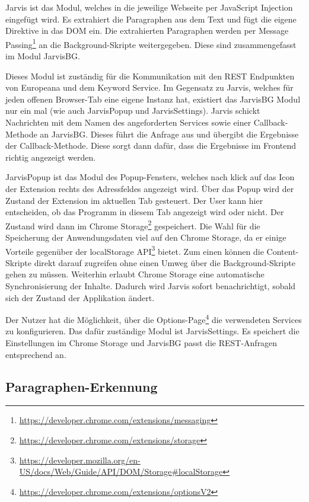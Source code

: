  Jarvis ist das Modul, welches in die jeweilige Webseite per JavaScript Injection eingefügt wird. Es extrahiert die Paragraphen aus dem Text und fügt die eigene Direktive in das DOM ein. Die extrahierten Paragraphen werden per Message Passing\footnote{\url{https://developer.chrome.com/extensions/messaging}} an die Background-Skripte weitergegeben. Diese sind zusammengefasst im Modul JarvisBG. 

 Dieses Modul ist zuständig für die Kommunikation mit den REST Endpunkten von Europeana und dem Keyword Service. Im Gegensatz zu Jarvis, welches für jeden offenen Browser-Tab eine eigene Instanz hat, existiert das JarvisBG Modul nur ein mal (wie auch JarvisPopup und JarvisSettings). Jarvis schickt Nachrichten mit dem Namen des angeforderten Services sowie einer Callback-Methode an JarvisBG. Dieses führt die Anfrage aus und übergibt die Ergebnisse der Callback-Methode. Diese sorgt dann dafür, dass die Ergebnisse im Frontend richtig angezeigt werden. 

 JarvisPopup ist das Modul des Popup-Fensters, welches nach klick auf das Icon der Extension rechts des Adressfeldes angezeigt wird. Über das Popup wird der Zustand der Extension im aktuellen Tab gesteuert. Der User kann hier entscheiden, ob das Programm in diesem Tab angezeigt wird oder nicht. Der Zustand wird dann im Chrome Storage\footnote{\url{https://developer.chrome.com/extensions/storage}} gespeichert. Die Wahl für die Speicherung der Anwendungsdaten viel auf den Chrome Storage, da er einige Vorteile gegenüber der localStorage API\footnote{\url{https://developer.mozilla.org/en-US/docs/Web/Guide/API/DOM/Storage\#localStorage}} bietet. Zum einen können die Content-Skripte direkt darauf zugreifen ohne einen Umweg über die Background-Skripte gehen zu müssen. Weiterhin erlaubt Chrome Storage eine automatische Synchronisierung der Inhalte. Dadurch wird Jarvis sofort benachrichtigt, sobald sich der Zustand der Applikation ändert.

 Der Nutzer hat die Möglichkeit, über die Options-Page\footnote{\url{https://developer.chrome.com/extensions/optionsV2}} die verwendeten Services zu konfigurieren. Das dafür zuständige Modul ist JarvisSettings. Es speichert die Einstellungen im Chrome Storage und JarvisBG passt die REST-Anfragen entsprechend an.

 \subsection{Paragraphen-Erkennung}
 
